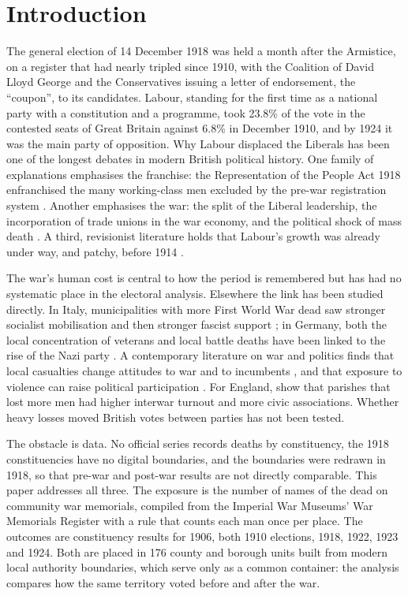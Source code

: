 \documentclass[11pt,a4paper]{article}
\begin{document}
\section{Introduction}
The general election of 14 December 1918 was held a month after the Armistice, on a register that had nearly tripled since 1910, with the Coalition of David Lloyd George and the Conservatives issuing a letter of endorsement, the ``coupon'', to its candidates. Labour, standing for the first time as a national party with a constitution and a programme, took 23.8\% of the vote in the contested seats of Great Britain against 6.8\% in December 1910, and by 1924 it was the main party of opposition. Why Labour displaced the Liberals has been one of the longest debates in modern British political history. One family of explanations emphasises the franchise: the Representation of the People Act 1918 enfranchised the many working-class men excluded by the pre-war registration system \citep{matthew1976,blewett1965}. Another emphasises the war: the split of the Liberal leadership, the incorporation of trade unions in the war economy, and the political shock of mass death \citep{wilson1966,mckibbin1974,turner1992}. A third, revisionist literature holds that Labour's growth was already under way, and patchy, before 1914 \citep{clarke1971,tanner1990,laybourn1995}.

The war's human cost is central to how the period is remembered but has had no systematic place in the electoral analysis. Elsewhere the link has been studied directly. In Italy, municipalities with more First World War dead saw stronger socialist mobilisation and then stronger fascist support \citep{acemoglu2022}; in Germany, both the local concentration of veterans and local battle deaths have been linked to the rise of the Nazi party \citep{koenig2023,dejuan2024}. A contemporary literature on war and politics finds that local casualties change attitudes to war and to incumbents \citep{gartner1997,karol2007,kriner2007}, and that exposure to violence can raise political participation \citep{blattman2009,bellows2009,bauer2016}. For England, \citet{carozzi2023} show that parishes that lost more men had higher interwar turnout and more civic associations. Whether heavy losses moved British votes between parties has not been tested.

The obstacle is data. No official series records deaths by constituency, the 1918 constituencies have no digital boundaries, and the boundaries were redrawn in 1918, so that pre-war and post-war results are not directly comparable. This paper addresses all three. The exposure is the number of names of the dead on community war memorials, compiled from the Imperial War Museums' War Memorials Register with a rule that counts each man once per place. The outcomes are constituency results for 1906, both 1910 elections, 1918, 1922, 1923 and 1924. Both are placed in 176 county and borough units built from modern local authority boundaries, which serve only as a common container: the analysis compares how the same territory voted before and after the war.
\end{document}
